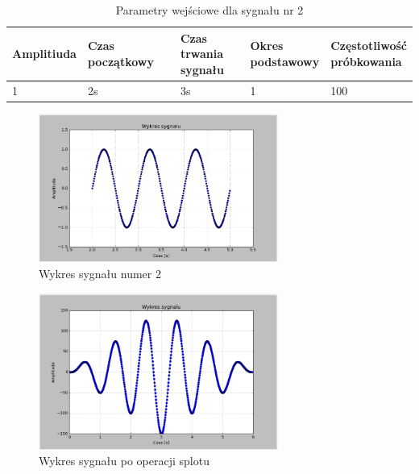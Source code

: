 \documentclass{article}
\begin{document}
{{                \begin{table}[h!]
                    \centering
                    \begin{tabular}{|l|l|l|l|l|}
                        \hline
                        Amplitiuda & Czas początkowy & \shortstack{Czas trwania \\ sygnału} & \shortstack{Okres \\ podstawowy} & \shortstack{Częstotliwość\\ próbkowania}   \\ \hline
                        1 & 2s & 3s & 1 & 100           \\ \hline
                    \end{tabular}
                    \caption{Parametry wejściowe dla sygnału nr 2}
                \end{table}
                \begin{figure}[h!]
                    \centering
                    \includegraphics[width=0.7\textwidth]{img/splot2.png}
                    \caption{Wykres sygnału numer 2}
                \end{figure}

                \begin{figure}[h!]
                    \centering
                    \includegraphics[width=0.7\textwidth]{img/splot3.png}
                    \caption{Wykres sygnału po operacji splotu}
                \end{figure}
            }
            \FloatBarrier
}
\end{document}
